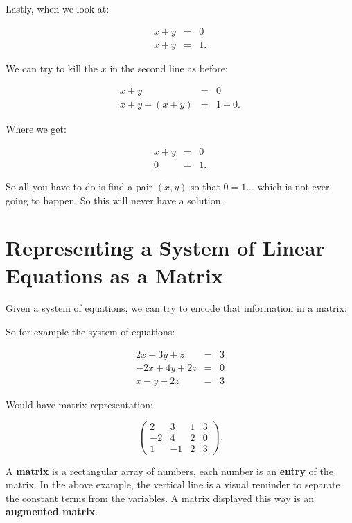 \begin{example}


 Lastly, when we look at:

\begin{eqnarray*}
x+y&=&0\\
x+y&=&1.
\end{eqnarray*}

We can try to kill the $x$ in the second line as before:

\begin{eqnarray*}
x+y&=&0\\
x+y-(x+y)&=&1-0.
\end{eqnarray*}

Where we get:

\begin{eqnarray*}
x+y&=&0\\
0&=&1.
\end{eqnarray*}

So all you have to do is find a pair $(x,y)$ so that $0=1$... which is not ever going to happen.  So this will never have a solution.


\end{example}



\section{Representing a System of Linear Equations as a Matrix}\label{Section:SystemasMatrix}

Given a system of equations, we can try to encode that information in a matrix:

So for example the system of equations:

\begin{eqnarray*}
2x+3y+z&=&3\\
-2x+4y+2z&=&0\\
x-y+2z&=&3
\end{eqnarray*}

Would have matrix representation:

$$ \left( \begin{array}{rrr|r}
2 & 3 & 1& 3\\
-2 & 4 & 2 & 0\\
1 & -1 & 2 & 3
\end{array}\right).$$

A \textbf{matrix} is a rectangular array of numbers, each number is an \textbf{entry} of the matrix.  In the above example, the vertical line is a visual reminder to separate the constant terms from the variables.  A matrix displayed this way is an \textbf{augmented matrix}.

